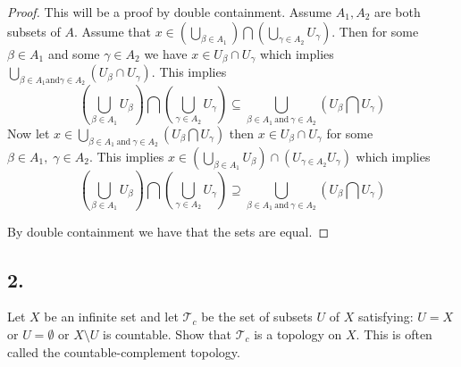\documentclass{amsart}
\theoremstyle{plain}
\theoremstyle{definition}
\theoremstyle{remark}
\begin{document}
\begin{proof}
    This will be a proof by double containment. Assume $A_1,A_2$ are both subsets of $A$.
    Assume that $x\in \left( \bigcup_{\beta \in A_1}\right) \bigcap \left( \bigcup_{\gamma \in A_2}U_{\gamma}\right)$. Then for some $\beta \in A_1$ and some $\gamma \in A_2$ we have $x\in U_\beta \cap U_\gamma$ which implies $\bigcup _{\beta \in A_1 \text{and} \gamma \in A_2}(U_\beta \cap U_\gamma)$. This implies \[
        \left( \bigcup _{\beta \in A_1} U_{\beta} \right) \bigcap \left( \bigcup _{\gamma \in A_2} U_{\gamma} \right) \subseteq \bigcup _{\beta \in A_1 \ \mbox{and} \ \gamma \in A_2} (U_{\beta} \bigcap U_{\gamma})
        \]
    Now let $x\in \bigcup _{\beta \in A_1 \ \mbox{and} \ \gamma \in A_2} (U_{\beta} \bigcap U_{\gamma})$ then $x\in U_\beta \cap U_\gamma$ for some $\beta \in A_1, \; \gamma \in A_2$. This implies $x\in \left( \bigcup_{\beta \in A_1} U_\beta\right)\cap \left(U_{\gamma \in A_2}U_\gamma\right)$ which implies \[   \left( \bigcup _{\beta \in A_1} U_{\beta} \right) \bigcap \left( \bigcup _{\gamma \in A_2} U_{\gamma} \right) \supseteq \bigcup _{\beta \in A_1 \ \mbox{and} \ \gamma \in A_2} (U_{\beta} \bigcap U_{\gamma})\]

    By double containment we have that the sets are equal. 

\end{proof}


\vspace{.15in}




\noindent
\subsection*{2.} Let $X$ be an infinite set and let $\mathcal T _c$ be the set of subsets $U$ of $X$ satisfying: $U=X$ or $U=\emptyset$ or $X\setminus U$ is countable. Show that $\mathcal T _c$ is a topology on $X$. This is often called the countable-complement topology.
\end{document}
